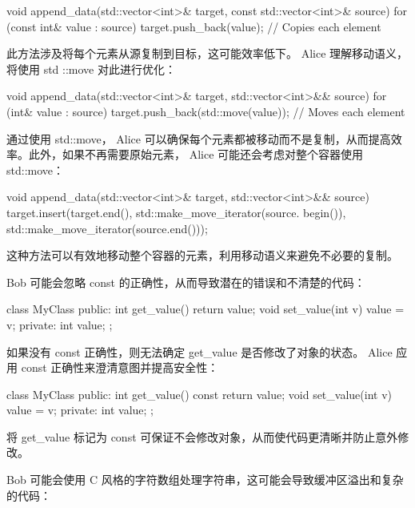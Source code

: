 \begin{cpp}
void append_data(std::vector<int>& target, const std::vector<int>&
source) {
    for (const int& value : source) {
        target.push_back(value); // Copies each element
    }
}
\end{cpp}

此方法涉及将每个元素从源复制到目标，这可能效率低下。 Alice 理解移动语义，将使用 std ::move 对此进行优化：

\begin{cpp}
void append_data(std::vector<int>& target, std::vector<int>&& source)
{
    for (int& value : source) {
        target.push_back(std::move(value)); // Moves each element
    }
}
\end{cpp}

通过使用 std::move， Alice 可以确保每个元素都被移动而不是复制，从而提高效率。此外，如果不再需要原始元素， Alice 可能还会考虑对整个容器使用 std::move：

\begin{cpp}
void append_data(std::vector<int>& target, std::vector<int>&& source)
{
    target.insert(target.end(), std::make_move_iterator(source.
        begin()), std::make_move_iterator(source.end()));
}
\end{cpp}

这种方法可以有效地移动整个容器的元素，利用移动语义来避免不必要的复制。


Bob 可能会忽略 const 的正确性，从而导致潜在的错误和不清楚的代码：

\begin{cpp}
class MyClass {
public:
    int get_value() { return value; }
    void set_value(int v) { value = v; }
private:
    int value;
};
\end{cpp}

如果没有 const 正确性，则无法确定 get\_value 是否修改了对象的状态。 Alice 应用 const 正确性来澄清意图并提高安全性：

\begin{cpp}
class MyClass {
public:
    int get_value() const { return value; }
    void set_value(int v) { value = v; }
private:
    int value;
};
\end{cpp}

将 get\_value 标记为 const 可保证不会修改对象，从而使代码更清晰并防止意外修改。


Bob 可能会使用 C 风格的字符数组处理字符串，这可能会导致缓冲区溢出和复杂的代码：

